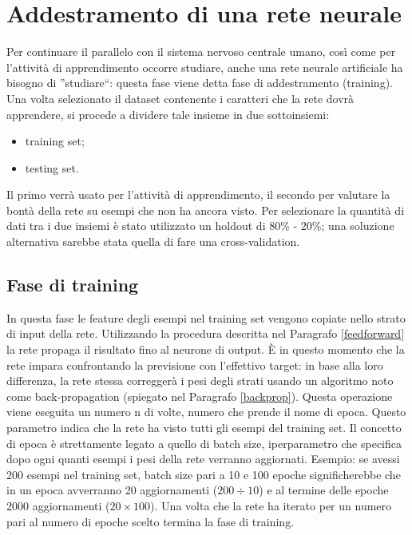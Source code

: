 \documentclass[12pt]{report}
\begin{document}
\section{Addestramento di una rete neurale}
Per continuare il parallelo con il sistema nervoso centrale umano, così come per l'attività di apprendimento occorre studiare, anche una rete neurale artificiale ha bisogno di ''studiare``: questa fase viene detta fase di addestramento (training).
Una volta selezionato il dataset contenente i caratteri che la rete dovrà apprendere, si procede a dividere tale insieme in due sottoinsiemi:

\begin{itemize}
\item{training set};
\item{testing set}.
\end{itemize}

Il primo verrà usato per l'attività di apprendimento, il secondo per valutare la bontà della rete su esempi che non ha ancora visto. Per selezionare la quantità di dati tra i due insiemi è stato utilizzato un holdout di 80\% - 20\%; una soluzione alternativa sarebbe stata quella di fare una cross-validation.

\subsection{Fase di training}
In questa fase le feature degli esempi nel training set vengono copiate nello strato di input della rete. Utilizzando la procedura descritta nel Paragrafo \ref{feedforward} la rete propaga il risultato fino al neurone di output. È in questo momento che la rete impara confrontando la previsione con l’effettivo target: in base alla loro differenza, la rete stessa correggerà i pesi degli strati usando un algoritmo noto come back-propagation (spiegato nel Paragrafo \ref{backprop}).
Questa operazione viene eseguita un numero n di volte, numero che prende il nome di epoca. Questo parametro indica che la rete ha visto tutti gli esempi del training set. Il concetto di epoca è strettamente legato a quello di batch size, iperparametro che specifica dopo ogni quanti esempi i pesi della rete verranno aggiornati.
Esempio: se avessi 200 esempi nel training set, batch size pari a 10 e 100 epoche significherebbe che in un epoca avverranno 20 aggiornamenti ($200 \div 10$) e al termine delle epoche 2000 aggiornamenti ($20 \times 100$).
Una volta che la rete ha iterato per un numero pari al numero di epoche scelto termina la fase di training.
\end{document}
